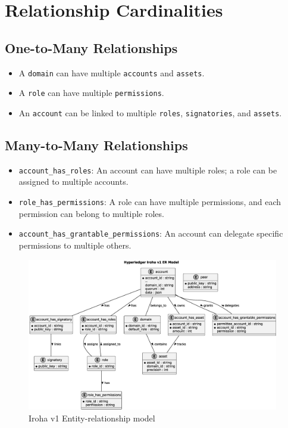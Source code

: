 \documentclass{article}
\begin{document}
\section{Relationship Cardinalities}
\subsection{One-to-Many Relationships}
\begin{itemize}
      \item A \texttt{domain} can have multiple \texttt{accounts} and \texttt{assets}.
      \item A \texttt{role} can have multiple \texttt{permissions}.
      \item An \texttt{account} can be linked to multiple \texttt{roles}, \texttt{signatories}, and \texttt{assets}.
\end{itemize}

\subsection{Many-to-Many Relationships}
\begin{itemize}
      \item \texttt{account\_has\_roles}: An account can have multiple roles; a role can be assigned to multiple accounts.
      \item \texttt{role\_has\_permissions}: A role can have multiple permissions, and each permission can belong to multiple roles.
      \item \texttt{account\_has\_grantable\_permissions}: An account can delegate specific permissions to multiple others.
\end{itemize}


\begin{figure}[htbp]
      \centering
      \includegraphics[width=0.98\textwidth, keepaspectratio]{iroha_v1_er_model.eps}
      \caption{Iroha v1 Entity-relationship model}
      \label{fig:iroha_v1_er_model}
\end{figure}
\end{document}
